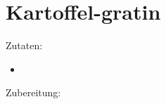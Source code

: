 \section{Kartoffel-gratin}
Zutaten:
\begin{itemize}
    \item
\end{itemize}

Zubereitung:

\newpage
\mbox{}
\vfill
\begin{center}
\end{center}
\vfill
\mbox{ }
\newpage
